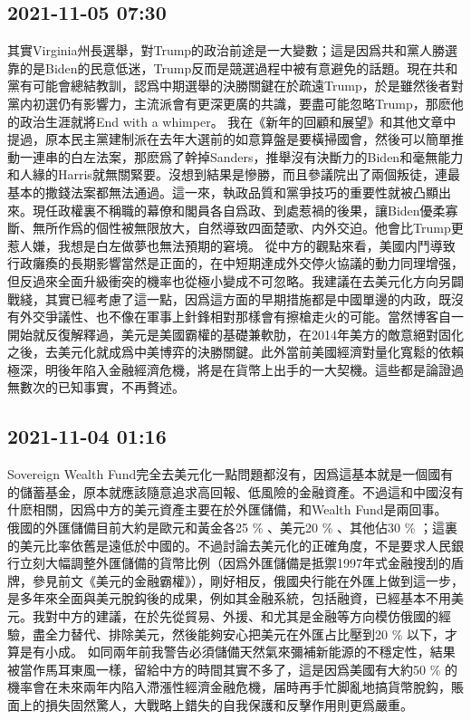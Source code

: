 \documentclass[twocolumn]{ctexart}
\begin{document}
\subsection*{2021-11-05 07:30}

其實Virginia州長選舉，對Trump的政治前途是一大變數；這是因爲共和黨人勝選靠的是Biden的民意低迷，Trump反而是競選過程中被有意避免的話題。現在共和黨有可能會總結教訓，認爲中期選舉的決勝關鍵在於疏遠Trump，於是雖然後者對黨内初選仍有影響力，主流派會有更深更廣的共識，要盡可能忽略Trump，那麽他的政治生涯就將End with a whimper。
我在《新年的回顧和展望》和其他文章中提過，原本民主黨建制派在去年大選前的如意算盤是要橫掃國會，然後可以簡單推動一連串的白左法案，那麽爲了幹掉Sanders，推舉沒有決斷力的Biden和毫無能力和人緣的Harris就無關緊要。沒想到結果是慘勝，而且參議院出了兩個叛徒，連最基本的撒錢法案都無法通過。這一來，執政品質和黨爭技巧的重要性就被凸顯出來。現任政權裏不稱職的幕僚和閣員各自爲政、到處惹禍的後果，讓Biden優柔寡斷、無所作爲的個性被無限放大，自然導致四面楚歌、内外交迫。他會比Trump更惹人嫌，我想是白左做夢也無法預期的窘境。
從中方的觀點來看，美國内鬥導致行政癱瘓的長期影響當然是正面的，在中短期達成外交停火協議的動力同理增强，但反過來全面升級衝突的機率也從極小變成不可忽略。我建議在去美元化方向另闢戰綫，其實已經考慮了這一點，因爲這方面的早期措施都是中國單邊的内政，既沒有外交爭議性、也不像在軍事上針鋒相對那樣會有擦槍走火的可能。當然博客自一開始就反復解釋過，美元是美國霸權的基礎兼軟肋，在2014年美方的敵意絕對固化之後，去美元化就成爲中美博弈的決勝關鍵。此外當前美國經濟對量化寬鬆的依賴極深，明後年陷入金融經濟危機，將是在貨幣上出手的一大契機。這些都是論證過無數次的已知事實，不再贅述。
\subsection*{2021-11-04 01:16}

Sovereign Wealth Fund完全去美元化一點問題都沒有，因爲這基本就是一個國有的儲蓄基金，原本就應該隨意追求高回報、低風險的金融資產。不過這和中國沒有什麽相關，因爲中方的美元資產主要在於外匯儲備，和Wealth Fund是兩回事。
俄國的外匯儲備目前大約是歐元和黃金各25 \% 、美元20 \% 、其他佔30 \% ；這裏的美元比率依舊是遠低於中國的。不過討論去美元化的正確角度，不是要求人民銀行立刻大幅調整外匯儲備的貨幣比例（因爲外匯儲備是抵禦1997年式金融搜刮的盾牌，參見前文《美元的金融霸權》），剛好相反，俄國央行能在外匯上做到這一步，是多年來全面與美元脫鈎後的成果，例如其金融系統，包括融資，已經基本不用美元。我對中方的建議，在於先從貿易、外援、和尤其是金融等方向模仿俄國的經驗，盡全力替代、排除美元，然後能夠安心把美元在外匯占比壓到20 \% 以下，才算是有小成。
如同兩年前我警告必須儲備天然氣來彌補新能源的不穩定性，結果被當作馬耳東風一樣，留給中方的時間其實不多了，這是因爲美國有大約50 \% 的機率會在未來兩年内陷入滯漲性經濟金融危機，届時再手忙脚亂地搞貨幣脫鈎，賬面上的損失固然驚人，大戰略上錯失的自我保護和反擊作用則更爲嚴重。
\end{document}
